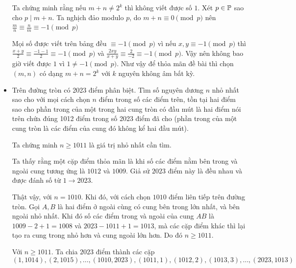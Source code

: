 \documentclass[11pt]{scrartcl}
\begin{document}
\begin{itemize}[label=, leftmargin=0em, itemsep=0.5em]
\begin{sol}
        Ta chứng minh rằng nếu $m + n \neq 2^k$ thì không viết được số $1$. Xét $p \in \mathbb{P}$ sao cho $p \mid m + n$. Ta nghịch đảo modulo $p$, do $m + n \equiv 0 \pmod{p}$ nên $\frac{m}{n} \equiv \frac{n}{m} \equiv - 1 \pmod{p}$
      
        Mọi số được viết trên bảng đều $\equiv - 1\pmod{p}$ vì nếu $x,y \equiv -1 \pmod{p}$ thì $\frac{x + y}{2} \equiv \frac{-1 - 1}{2} \equiv - 1\pmod{p}$ và $\frac{2xy}{x + y} \equiv \frac{2}{-2} \equiv -1\pmod{p}$. Vậy nên không bao giờ viết được $1$ vì $1 \neq - 1 \pmod{p}$. Như vậy để thỏa mãn đề bài thì chọn $(m,n)$ có dạng $m + n = 2^k$ với $k$ nguyên không âm bất kỳ.\end{sol}
        \item \begin{bt}
            Trên đường tròn có 2023 điểm phân biệt. Tìm số nguyên dương $n$ nhỏ nhất sao cho với mọi cách chọn $n$ điểm trong số các điểm trên, tồn tại hai điểm sao cho phần trong của một trong hai cung tròn có đầu mút là hai điểm nói trên chứa đúng 1012 điểm trong số 2023 điểm đã cho (phần trong của một cung tròn là các điểm của cung đó không kể hai đầu mút).
        \end{bt}
        \begin{sol}
            Ta chứng minh $n \geq 1011$ là giá trị nhỏ nhất cần tìm.
    
            Ta thấy rằng một cặp điểm thỏa mãn là khi số các điểm nằm bên trong và ngoài cung tương ứng là $1012$ và $1009$.
            Giả sử $2023$ điểm này là đều nhau và được đánh số từ $1 \to 2023$.
    
            Thật vậy, với $n = 1010$. Khi đó, với cách chọn $1010$ điểm liên tiếp trên đường tròn. Gọi $A,B$ là hai điểm ở ngoài cùng có cung bên trong lớn nhất, và bên ngoài nhỏ nhất. Khi đó số các điểm trong và ngoài của cung $AB$ là  $1009 - 2 + 1 = 1008$ và $2023 - 1011 + 1 = 1013$, mà các cặp điểm khác thì lại tạo ra cung trong nhỏ hơn và cung ngoài lớn hơn. Do đó $n \geq 1011$.
    
            Với $n \geq 1011$. Ta chia $2023$ điểm thành các cặp 
             \[(1,1014), (2,1015),\dots, (1010, 2023),(1011,1),(1012,2),(1013,3),\dots,(2023,1013) \tag{1}\]
    

\end{sol}
\end{itemize}
\end{document}
